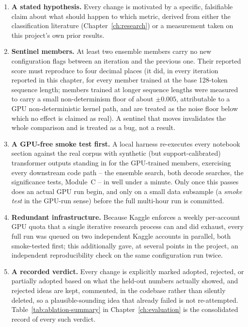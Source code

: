 \begin{enumerate}
\item \textbf{A stated hypothesis.} Every change is motivated by a specific,
  falsifiable claim about what should happen to which metric, derived from
  either the classification literature (Chapter~\ref{ch:research}) or a
  measurement taken on this project's own prior results.
\item \textbf{Sentinel members.} At least two ensemble members carry no new
  configuration flags between an iteration and the previous one. Their
  reported score must reproduce to four decimal places (it did, in every
  iteration reported in this chapter, for every member trained at the base
  128-token sequence length; members trained at longer sequence lengths were
  measured to carry a small non-determinism floor of about $\pm 0.005$,
  attributable to a GPU non-deterministic kernel path, and are treated as
  the noise floor below which no effect is claimed as real). A sentinel that
  moves invalidates the whole comparison and is treated as a bug, not a
  result.
\item \textbf{A GPU-free smoke test first.} A local harness re-executes every
  notebook section against the real corpus with synthetic (but
  support-calibrated) transformer outputs standing in for the GPU-trained
  members, exercising every downstream code path -- the ensemble search, both
  decode searches, the significance tests, Module~C -- in well under a
  minute. Only once this passes does an actual GPU run begin, and only on a
  small data subsample (a \emph{smoke test} in the GPU-run sense) before the
  full multi-hour run is committed.
\item \textbf{Redundant infrastructure.} Because Kaggle enforces a weekly
  per-account GPU quota that a single iterative research process can and did
  exhaust, every full run was queued on two independent Kaggle accounts in
  parallel, both smoke-tested first; this additionally gave, at several
  points in the project, an independent reproducibility check on the same
  configuration run twice.
\item \textbf{A recorded verdict.} Every change is explicitly marked adopted,
  rejected, or partially adopted based on what the held-out numbers actually
  showed, and rejected ideas are kept, commented, in the codebase rather than
  silently deleted, so a plausible-sounding idea that already failed is not
  re-attempted. Table~\ref{tab:ablation-summary} in
  Chapter~\ref{ch:evaluation} is the consolidated record of every such
  verdict.
\end{enumerate}
